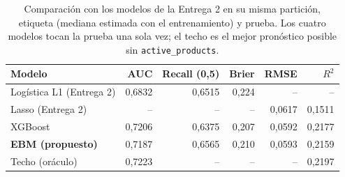 \begin{table}[htbp]
\caption{Comparación con los modelos de la Entrega 2 en su misma partición, etiqueta (mediana estimada con el entrenamiento) y prueba. Los cuatro modelos tocan la prueba una sola vez; el techo es el mejor pronóstico posible sin \texttt{active\_products}.}\label{tab:entrega2}
\scriptsize\setlength{\tabcolsep}{2.8pt}
\begin{tabular}{lrrrrr}
\toprule
\textbf{Modelo} & \textbf{AUC} & \textbf{Recall (0,5)} & \textbf{Brier} & \textbf{RMSE} & \textbf{$R^2$} \\
\midrule
Logística L1 (Entrega 2) & 0,6832 & 0,6515 & 0,224 & -- & -- \\
Lasso (Entrega 2) & -- & -- & -- & 0,0617 & 0,1511 \\
XGBoost & 0,7206 & 0,6375 & 0,207 & 0,0592 & 0,2177 \\
\textbf{EBM (propuesto)} & 0,7187 & 0,6565 & 0,210 & 0,0593 & 0,2159 \\
Techo (oráculo) & 0,7223 & -- & -- & -- & 0,2197 \\
\bottomrule
\end{tabular}
\end{table}
